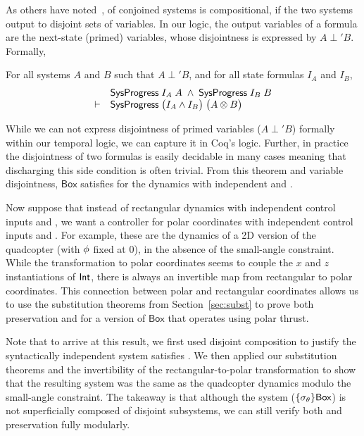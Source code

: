 As others have noted~\cite{alur1997modularity}, \progress{} of conjoined
systems is compositional, if the two systems output to disjoint sets of
variables.  In our logic, the output variables of a formula are the
next-state (primed) variables, whose disjointness is expressed by $A \perp'
B$.  Formally,
\begin{theorem}{}
For all systems $A$ and $B$ such that $A \perp' B$, and for all state formulas $I_A$ and $I_B$,
\[\begin{array}{rl}
       & \mathsf{SysProgress{}}\;I_A\;A \;\wedge\; \mathsf{SysProgress{}}\;I_B\;B \\
\vdash & \mathsf{SysProgress{}}\;\big(I_A \wedge I_B\big)\;\big(A \otimes B\big)
\end{array}
\]
\end{theorem}
While we can not express disjointness of primed variables ($A \perp' B$)
formally within our temporal logic, we can capture it in Coq's logic.
Further, in practice the disjointness of two formulas is easily decidable
in many cases meaning that discharging this side condition is often
trivial.  From this theorem and variable disjointness, $\mathsf{Box}$
satisfies \progress{} for the dynamics with independent 
and .

Now suppose that instead of rectangular dynamics with independent control
inputs  and , we want a controller for polar
coordinates with independent control inputs  and \tlavar{\pitch}.
For example, these are the dynamics of a 2D version of the quadcopter (with
$\mathbf{\phi}$ fixed at 0), in the absence of the small-angle constraint.
While the transformation to polar coordinates seems to couple the $x$ and
$z$ instantiations of ${\mathsf{Int}}$, there is always an invertible map
from rectangular to polar coordinates.  This connection between polar and
rectangular coordinates allows us to use the substitution theorems from
Section~\ref{sec:subst} to prove both preservation and \progress{} for a
version of $\mathsf{Box}$ that operates using polar thrust.

Note that to arrive at this result, we first used disjoint composition to
justify the syntactically independent system satisfies \progress{}.  We
then applied our substitution theorems and the invertibility of the
rectangular-to-polar transformation to show that the resulting system was
the same as the quadcopter dynamics modulo the small-angle constraint. The
takeaway is that although the system
($\{\sigma_{\theta}\}\mathsf{Box}$) is not superficially composed of
disjoint subsystems, we can still verify both \progress{} and preservation
fully modularly.

